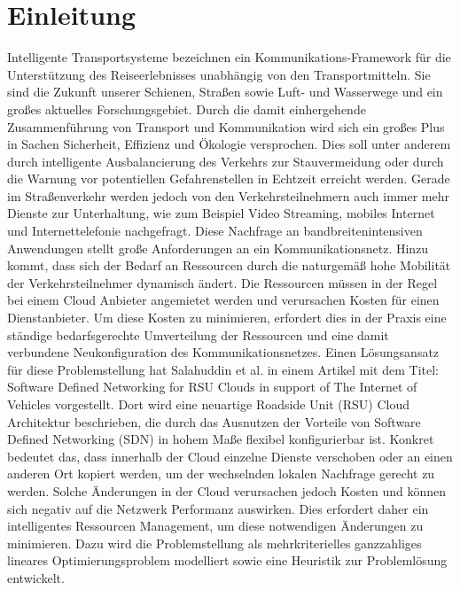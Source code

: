 \documentclass[conference]{IEEEtran}
\begin{document}
\section{Einleitung}

Intelligente Transportsysteme bezeichnen ein Kommunikations-Framework für die Unterstützung des Reiseerlebnisses unabhängig von den Transportmitteln. Sie sind die Zukunft unserer Schienen, Straßen sowie Luft- und Wasserwege und ein großes aktuelles Forschungsgebiet. Durch die damit einhergehende Zusammenführung von Transport und Kommunikation wird sich ein großes Plus in Sachen Sicherheit, Effizienz und Ökologie versprochen. Dies soll unter anderem durch intelligente Ausbalancierung des Verkehrs zur Stauvermeidung oder durch die Warnung vor potentiellen Gefahrenstellen in Echtzeit erreicht werden. Gerade im Straßenverkehr werden jedoch von den Verkehrsteilnehmern auch immer mehr Dienste zur Unterhaltung, wie zum Beispiel Video Streaming, mobiles Internet und Internettelefonie nachgefragt. Diese Nachfrage an bandbreitenintensiven Anwendungen stellt große Anforderungen an ein Kommunikationsnetz. Hinzu kommt, dass sich der Bedarf an Ressourcen durch die naturgemäß hohe Mobilität der Verkehrsteilnehmer dynamisch ändert. Die Ressourcen müssen in der Regel bei einem Cloud Anbieter angemietet werden und verursachen Kosten für einen Dienstanbieter. Um diese Kosten zu minimieren, erfordert dies in der Praxis eine ständige bedarfsgerechte Umverteilung der Ressourcen und eine damit verbundene Neukonfiguration des Kommunikationsnetzes. Einen Lösungsansatz für diese Problemstellung hat Salahuddin et al. in einem Artikel \cite{IEEEhowto:orig} mit dem 
Titel: \glqq Software Defined Networking for RSU Clouds in support of The Internet of Vehicles\grqq{} vorgestellt.
Dort wird eine neuartige Roadside Unit (RSU) Cloud Architektur beschrieben, die durch das Ausnutzen der Vorteile von Software Defined Networking (SDN) in hohem Maße flexibel konfigurierbar ist. Konkret bedeutet das, dass innerhalb der Cloud einzelne Dienste verschoben oder an einen anderen Ort kopiert werden, um der wechselnden lokalen Nachfrage gerecht zu werden. Solche Änderungen in der Cloud verursachen jedoch Kosten und können sich negativ auf die Netzwerk Performanz auswirken. Dies erfordert daher ein intelligentes Ressourcen Management, um diese notwendigen Änderungen zu minimieren. Dazu wird die Problemstellung als mehrkriterielles ganzzahliges lineares Optimierungsproblem modelliert sowie eine Heuristik zur Problemlösung entwickelt.\\
\end{document}
